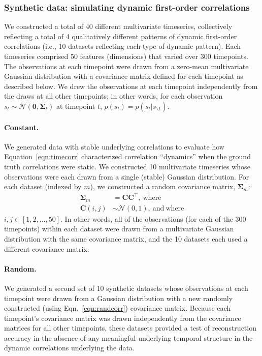 \documentclass[english]{article}
\begin{document}
\subsubsection*{Synthetic data: simulating dynamic first-order correlations}
We constructed a total of 40 different multivariate timeseries,
collectively reflecting a total of 4 qualitatively different patterns
of dynamic first-order correlations (i.e., 10 datasets reflecting each type of
dynamic pattern).  Each timeseries comprised 50 features (dimensions)
that varied over 300 timepoints.  The observations at each timepoint
were drawn from a zero-mean multivariate Gaussian distribution with a
covariance matrix defined for each timepoint as described below.  We
drew the observations at each timepoint independently from the draws
at all other timepoints; in other words, for each observation
$s_t \sim \mathcal{N}\left(\mathbf{0}, \mathbf{\Sigma}_t\right)$ at
timepoint $t$, $p(s_t) = p(s_t | s_{\backslash t})$.

\paragraph*{Constant.}  We generated data with stable underlying
correlations to evaluate how Equation~\ref{eqn:timecorr} characterized
correlation ``dynamics'' when the ground truth correlations were
static.  We constructed 10 multivariate timeseries whose observations
were each drawn from a single (stable) Gaussian distribution.  For
each dataset (indexed by $m$), we constructed a random covariance matrix,
$\mathbf{\Sigma}_m$:
\begin{align}
   \mathbf{\Sigma}_m &= \mathbf{C}
                                          \mathbf{C}^\top\mathrm{,~where}\label{eqn:randcorr}\\
  \mathbf{C}(i, j) &\sim \mathcal{N}(0, 1)\mathrm{,~and~where}
  \end{align}
  $i, j \in \left[1, 2, ..., 50 \right]$.  In other words, all of the
  observations (for each of the 300 timepoints) within each dataset
  were drawn from a multivariate Gaussian distribution with the same
  covariance matrix, and the 10 datasets each used a different
  covariance matrix.
  
  \paragraph*{Random.}  We generated a second set of 10 synthetic
  datasets whose observations at each timepoint were drawn from a
  Gaussian distribution with a new randomly constructed (using
  Eqn.~\ref{eqn:randcorr}) covariance matrix.  Because each
  timepoint's covariance matrix was drawn independently from the
  covariance matrices for all other timepoints, these datasets
  provided a test of reconstruction accuracy in the absence of any
  meaningful underlying temporal structure in the dynamic correlations
  underlying the data.
  
\end{document}
